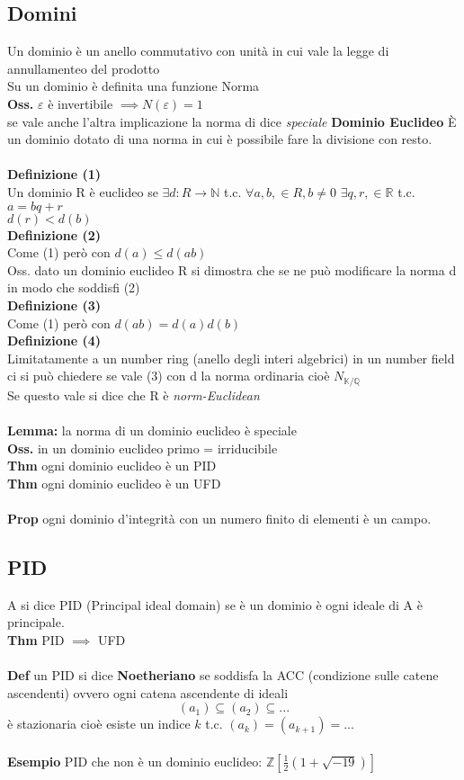 \documentclass[10pt,a4paper]{article}
\begin{document}
\subsection{Domini}
Un dominio è un anello commutativo con unità in cui vale la legge di annullamenteo del prodotto\\
Su un dominio è definita una funzione Norma\\
\textbf{Oss.} $\varepsilon$ è invertibile $\implies N(\varepsilon)=1$\\
se vale anche l'altra implicazione la norma di dice \textit{speciale}
\textbf{Dominio Euclideo}
È un dominio dotato di una norma in cui è possibile fare la divisione con resto.\\\\
\textbf{Definizione (1)}\\
Un dominio R è euclideo se $\exists d:R \to \mathbb{N}$ t.c.
$\forall a,b, \in R, b\neq 0$ $\exists q,r,\in \mathbb{R}$ t.c.\\
$a= bq+r$\\
$d(r) < d(b)$\\
\textbf{Definizione (2)}\\
Come (1) però con $d(a) \leq d(ab)$\\
Oss. dato un dominio euclideo R si dimostra che se ne può modificare la norma d in modo che soddisfi (2)\\
\textbf{Definizione (3)}\\
Come (1) però con $ d(ab) = d(a)d(b) $\\
\textbf{Definizione (4)}\\
Limitatamente a un number ring (anello degli interi algebrici) in un number field ci si può chiedere se vale (3) con d la norma ordinaria cioè $N_{\mathbb{K}/{\mathbb{Q}}}$\\
Se questo vale si dice che R è \textit{norm-Euclidean}\\\\
\textbf{Lemma:} la norma di un dominio euclideo è speciale\\
\textbf{Oss.} in un dominio euclideo primo = irriducibile\\
\textbf{Thm} ogni dominio euclideo è un PID\\
\textbf{Thm} ogni dominio euclideo è un UFD\\\\
\textbf{Prop} ogni dominio d'integrità con un numero finito di elementi è un campo.
\subsection{PID}
A si dice PID (Principal ideal domain) se è un dominio è ogni ideale di A è principale.\\
\textbf{Thm} PID $\implies$ UFD\\\\
\textbf{Def} un PID si dice \textbf{Noetheriano} se soddisfa la ACC (condizione sulle catene ascendenti) ovvero ogni catena ascendente di ideali\\
$$ (a_1) \subseteq (a_2) \subseteq ...$$
è stazionaria cioè esiste un indice $k$ t.c. $(a_k)=(a_{k+1})=...$\\\\
\textbf{Esempio} PID che non è un dominio euclideo: $\mathbb{Z}[\frac{1}{2}(1+\sqrt {-19})]$
\end{document}
